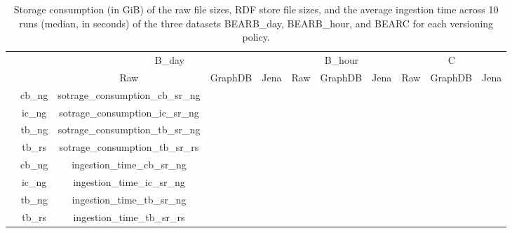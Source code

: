 \begin{table}
    \centering
    \begin{tabular}{p{}c|c|c|c|c|c|c|c|c|c}
                                                             &  & \multicolumn{3}{c|}{B\_day} & \multicolumn{3}{c|}{B\_hour} & \multicolumn{3}{c}{C} \\
       \cline{3-11} 
        & & Raw  & GraphDB  & Jena   & Raw  & GraphDB  & Jena  & Raw  & GraphDB  & Jena  \\                                                        
        \hline
    \multicolumn{1}{c|}{\multirow{4}{*}{\rotatebox{90}{\parbox{2.0cm}{\centering Storage\\consumption\\in GiB}}}} & cb\_ng & {{sotrage_consumption_cb_sr_ng}}   \\
        \multicolumn{1}{c|}{}  & ic\_ng & {{sotrage_consumption_ic_sr_ng}}   \\
        \multicolumn{1}{c|}{}  & tb\_ng  & {{sotrage_consumption_tb_sr_ng}}    \\
        \multicolumn{1}{c|}{}  & tb\_rs  & {{sotrage_consumption_tb_sr_rs}}   \\
       \hline
       \multicolumn{1}{c|}{\multirow{4}{*}{\rotatebox{90}{\parbox{2.0cm}{\centering Ingestion\\time\\in seconds}}}} & cb\_ng & {{ingestion_time_cb_sr_ng}}   \\
    \multicolumn{1}{c|}{}   & ic\_ng  & {{ingestion_time_ic_sr_ng}}   \\
    \multicolumn{1}{c|}{}  & tb\_ng  & {{ingestion_time_tb_sr_ng}}  \\
    \multicolumn{1}{c|}{}   & tb\_rs  & {{ingestion_time_tb_sr_rs}}   \\
    \end{tabular}
    \caption{Storage consumption (in GiB) of the raw file sizes, RDF store file sizes, and the average ingestion time across 10 runs (median, in seconds) of the three datasets BEARB\_day, BEARB\_hour, and BEARC for each versioning policy.}
    \label{tab:eval_results_storage}
\end{table}
